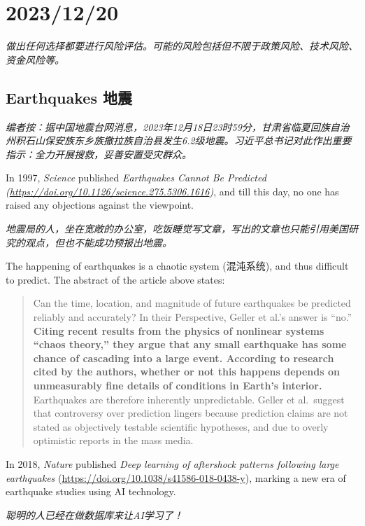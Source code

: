 \chapter{2023/12/20}\label{20231220}

\emph{做出任何选择都要进行风险评估。可能的风险包括但不限于政策风险、技术风险、资金风险等。}

\section{Earthquakes 地震}\label{earthquakes-ux5730ux9707}

\emph{编者按：据中国地震台网消息，2023年12月18日23时59分，甘肃省临夏回族自治州积石山保安族东乡族撒拉族自治县发生6.2级地震。习近平总书记对此作出重要指示：全力开展搜救，妥善安置受灾群众。}

In 1997, \emph{Science} published \emph{Earthquakes
Cannot Be Predicted (\url{https://doi.org/10.1126/science.275.5306.1616})}, and till this day, no one has raised any
objections against the viewpoint.

\emph{地震局的人，坐在宽敞的办公室，吃饭睡觉写文章，写出的文章也只能引用美国研究的观点，但也不能成功预报出地震。}

The happening of earthquakes is a chaotic system (混沌系统), and thus
difficult to predict. The abstract of the article above states:

\begin{quote}
Can the time, location, and magnitude of future earthquakes be predicted
reliably and accurately? In their Perspective, Geller et al.'s answer is
``no.'' \textbf{Citing recent results from the physics of nonlinear
systems ``chaos theory,'' they argue that any small earthquake has some
chance of cascading into a large event. According to research cited by
the authors, whether or not this happens depends on unmeasurably fine
details of conditions in Earth's interior.} Earthquakes are therefore
inherently unpredictable. Geller et al.~suggest that controversy over
prediction lingers because prediction claims are not stated as
objectively testable scientific hypotheses, and due to overly optimistic
reports in the mass media.
\end{quote}

In 2018, \emph{Nature} published \emph{Deep learning of aftershock patterns following large earthquakes} (\url{https://doi.org/10.1038/s41586-018-0438-y}), marking a new era of earthquake studies using AI technology.

\emph{聪明的人已经在做数据库来让AI学习了！}

